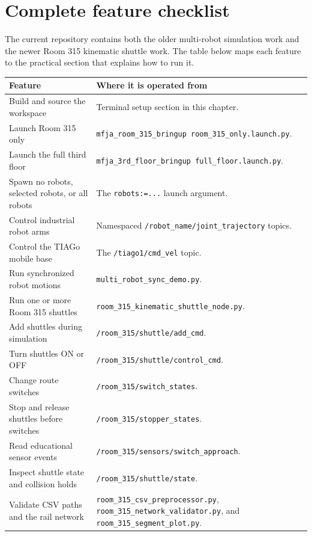 \documentclass[12pt,a4paper]{report}
\begin{document}
\section{Complete feature checklist}

The current repository contains both the older multi-robot simulation work and
the newer Room 315 kinematic shuttle work. The table below maps each feature to
the practical section that explains how to run it.

\begingroup
\small
\begin{longtable}{@{}p{}p{}@{}}
\toprule
Feature & Where it is operated from \\
\midrule
\endhead
Build and source the workspace & Terminal setup section in this chapter. \\
\addlinespace
Launch Room 315 only & \texttt{mfja\_room\_315\_bringup room\_315\_only.launch.py}. \\
\addlinespace
Launch the full third floor & \texttt{mfja\_3rd\_floor\_bringup full\_floor.launch.py}. \\
\addlinespace
Spawn no robots, selected robots, or all robots &
The \texttt{robots:=...} launch argument. \\
\addlinespace
Control industrial robot arms &
Namespaced \texttt{/robot\_name/joint\_trajectory} topics. \\
\addlinespace
Control the TIAGo mobile base &
The \texttt{/tiago1/cmd\_vel} topic. \\
\addlinespace
Run synchronized robot motions &
\texttt{multi\_robot\_sync\_demo.py}. \\
\addlinespace
Run one or more Room 315 shuttles &
\texttt{room\_315\_kinematic\_shuttle\_node.py}. \\
\addlinespace
Add shuttles during simulation &
\texttt{/room\_315/shuttle/add\_cmd}. \\
\addlinespace
Turn shuttles ON or OFF &
\texttt{/room\_315/shuttle/control\_cmd}. \\
\addlinespace
Change route switches &
\texttt{/room\_315/switch\_states}. \\
\addlinespace
Stop and release shuttles before switches &
\texttt{/room\_315/stopper\_states}. \\
\addlinespace
Read educational sensor events &
\texttt{/room\_315/sensors/switch\_approach}. \\
\addlinespace
Inspect shuttle state and collision holds &
\texttt{/room\_315/shuttle/state}. \\
\addlinespace
Validate CSV paths and the rail network &
\texttt{room\_315\_csv\_preprocessor.py},
\texttt{room\_315\_network\_validator.py}, and
\texttt{room\_315\_segment\_plot.py}. \\
\bottomrule
\end{longtable}
\endgroup
\end{document}
